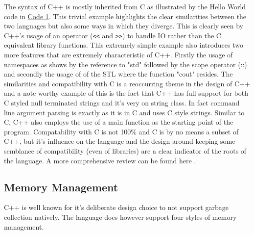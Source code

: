 \documentclass[conference, a4paper]{IEEEtran}
\begin{document}
The syntax of C++ is mostly inherited from C as illustrated by the Hello World code in \hyperref[listing:1]{Code 1}. This trivial example highlights the clear similarities between the two languages but also some ways in which they diverge. This is clearly seen by C++'s usage of an operator (\texttt{<<} and \texttt{>>}) to handle IO rather than the C equivalent library functions. This extremely simple example also introduces two more features that are extremely characteristic of C++. Firstly the usage of namespaces as shows by the reference to "std" followed by the scope operator (::) and secondly the usage of of the STL where the function "cout" resides. The similarities and compatibility with C is a reoccurring theme in the design of C++ and a note worthy example of this is the fact that C++ has full support for both C styled null terminated strings and it's very on string class. In fact command line argument parsing is exactly as it is in C and uses C style strings. Similar to C, C++ also employs the use of a main function as the starting point of the program. Compatability with C is not 100\% and C is by no means a subset of C++, but it's influence on the language and the design around keeping some semblance of compatibility (even of libraries) are a clear indicator of the roots of the language. A more comprehensive review can be found here \cite{calder1994quantifying}.

\subsection{Memory Management}

C++ is well known for it's deliberate design choice to not support garbage collection natively. The language does however support four styles of memory management. 
\end{document}

